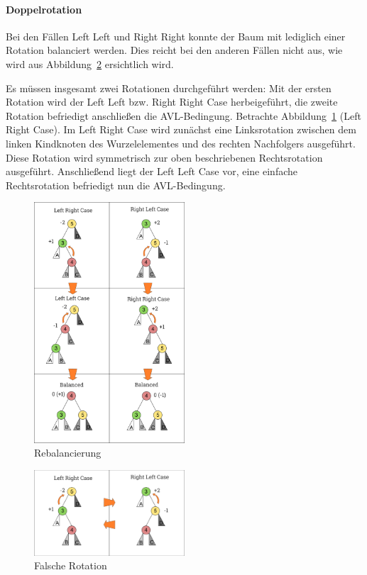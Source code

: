 \paragraph{Doppelrotation}

Bei den Fällen Left Left und Right Right konnte der Baum mit lediglich
einer Rotation balanciert werden.
Dies reicht bei den anderen Fällen nicht aus, wie wird aus Abbildung~\ref{fig:AVL-wrong-rotate}
ersichtlich wird.

Es müssen insgesamt zwei Rotationen durchgeführt werden:
Mit der ersten Rotation wird der Left Left bzw. Right Right Case
herbeigeführt, die zweite Rotation befriedigt anschließen die AVL-Bedingung.
Betrachte Abbildung~\ref{fig:AVL-Cases} (Left Right Case).
Im Left Right Case wird zunächst eine Linksrotation zwischen dem linken
Kindknoten des Wurzelelementes und des rechten Nachfolgers ausgeführt.
Diese Rotation wird symmetrisch zur oben beschriebenen Rechtsrotation ausgeführt.
Anschließend liegt der Left Left Case vor, eine einfache Rechtsrotation
befriedigt nun die AVL-Bedingung.


\begin{figure}[hbt]
    \centering
    \includegraphics[width= 0.5\textwidth]{img/AVL_Tree_Rebalancing}
    \caption{Rebalancierung}
    \label{fig:AVL-Cases}
\end{figure}
\begin{figure}[hbt]
    \centering
    \includegraphics[width= 0.5\textwidth]{img/AVL_Tree_Rebalancing_wrong.pdf}
    \caption{Falsche Rotation}
    \label{fig:AVL-wrong-rotate}
\end{figure}

